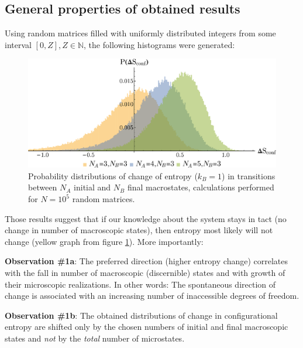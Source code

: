 \documentclass[a0]{sciposter}
\begin{document}
\begin{multicols}{3}
\begin{flushleft}
\section{General properties of obtained results}
Using random matrices filled with uniformly distributed integers from some interval $[0,Z], Z \in \mathbb{N}$, the following histograms were generated:

\begin{minipage}[b]{23.0cm}
\centering
\begin{figure}[ht!]
\includegraphics[width=23cm]{Figure2.eps} \caption{Probability distributions of change of entropy ($k_B =1$) in transitions between $N_A$ initial and $N_B$ final macrostates, calculations performed for $N=10^5$ random matrices.}
\label{Fig2} 
\end{figure}
\end{minipage}
\vspace{-0.5cm} 

Those results suggest that if our knowledge about the system stays in tact (no change in number of macroscopic states), then entropy most likely will not change (yellow graph from figure \ref{Fig2}). More importantly:

\vspace{0.6cm} 
\begin{tcolorbox}[colframe=green!500!white,colback=white!50!white,boxrule=3pt]
\textbf{Observation \#1a}: The preferred direction (higher entropy change) correlates with the fall in number of macroscopic (discernible) states and with growth of their microscopic realizations. In other words: The spontaneous direction of change is associated with an increasing number of inaccessible degrees of freedom.
\end{tcolorbox}


\vspace{0.6cm} 
\begin{tcolorbox}[colframe=green!500!white,colback=white!50!white,boxrule=3pt]
\textbf{Observation \#1b}: The obtained distributions of change in configurational entropy are shifted only by the chosen numbers of initial and final macroscopic states and \textit{not} by the \textit{total} number of microstates.
\end{tcolorbox}


\end{flushleft}
\end{multicols}
\end{document}
